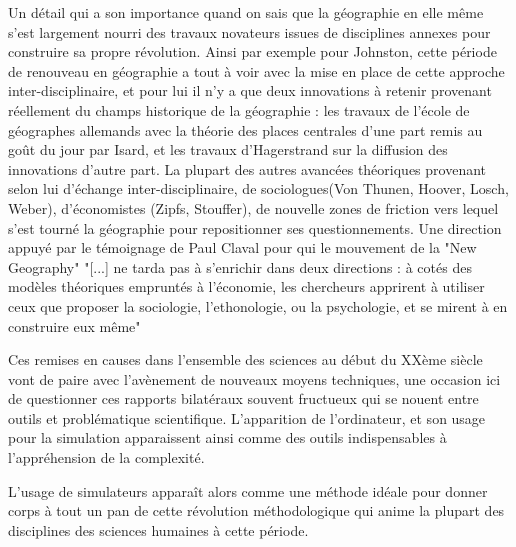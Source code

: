 Un détail qui a son importance quand on sais que la géographie en elle même s'est largement nourri des travaux novateurs issues de disciplines annexes pour construire sa propre révolution.  Ainsi par exemple pour Johnston, cette période de renouveau en géographie a tout à voir avec la mise en place de cette approche inter-disciplinaire, et pour lui il n'y a que deux innovations à retenir provenant réellement du champs historique de la géographie : les travaux de l'école de géographes allemands avec la théorie des places centrales d'une part remis au goût du jour par Isard, et les travaux d'Hagerstrand sur la diffusion des innovations d'autre part. La plupart des autres avancées théoriques provenant selon lui d'échange inter-disciplinaire, de sociologues(Von Thunen, Hoover, Losch, Weber), d'économistes (Zipfs, Stouffer), de nouvelle zones de friction vers lequel s'est tourné la géographie pour repositionner ses questionnements. Une direction appuyé par le témoignage de Paul Claval pour qui le mouvement de la "New Geography" \autocite[6]{Claval1977} "[...] ne tarda pas à s'enrichir dans deux directions : à cotés des modèles théoriques empruntés à l'économie, les chercheurs apprirent à utiliser ceux que proposer la sociologie, l'ethonologie, ou la psychologie, et se mirent à en construire eux même"


Ces remises en causes dans l'ensemble des sciences au début du XXème siècle vont de paire avec l’avènement de nouveaux moyens techniques, une occasion ici de questionner ces rapports bilatéraux souvent fructueux qui se nouent entre outils et problématique scientifique. L'apparition de l'ordinateur, et son usage pour la simulation \autocite[50]{Zwirn2006} \autocite{Simon1996} apparaissent ainsi comme des outils indispensables à l'appréhension de la complexité.

L'usage de simulateurs apparaît alors comme une méthode idéale pour donner corps à tout un pan de cette révolution méthodologique qui anime la plupart des disciplines des sciences humaines à cette période. 



